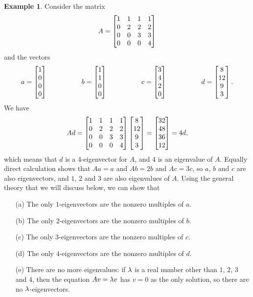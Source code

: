 \documentclass[reqno]{amsart}
\theoremstyle{definition}
\newtheorem{example}[theorem]{Example}
\begin{document}
\begin{example}\label{eg-eigen-ii}
 Consider the matrix
 \[ A = \left[\begin{matrix} 1 & 1 & 1 & 1 \\
             0 & 2 & 2 & 2 \\
             0 & 0 & 3 & 3 \\
             0 & 0 & 0 & 4 \end{matrix}\right]
 \]
 and the vectors
 \[ a = \left[\begin{matrix} 1 \\ 0  \\ 0 \\ 0 \end{matrix}\right] \hspace{5em}
    b = \left[\begin{matrix} 1 \\ 1  \\ 0 \\ 0 \end{matrix}\right] \hspace{5em}
    c = \left[\begin{matrix} 3 \\ 4  \\ 2 \\ 0 \end{matrix}\right] \hspace{5em}
    d = \left[\begin{matrix} 8 \\ 12 \\ 9 \\ 3 \end{matrix}\right].
 \]
 We have
 \[ Ad =
        \left[\begin{matrix} 1 & 1 & 1 & 1 \\
             0 & 2 & 2 & 2 \\
             0 & 0 & 3 & 3 \\
             0 & 0 & 0 & 4 \end{matrix}\right]
        \left[\begin{matrix} 8 \\ 12 \\ 9 \\ 3 \end{matrix}\right] =
        \left[\begin{matrix} 32 \\ 48 \\ 36 \\ 12 \end{matrix}\right] = 4d,
 \]
 which means that $d$ is a $4$-eigenvector for $A$, and $4$ is an
 eigenvalue of $A$.  Equally direct calculation shows that $Aa=a$ and
 $Ab=2b$ and $Ac=3c$, so $a$, $b$ and $c$ are also eigenvectors, and
 $1$, $2$ and $3$ are also eigenvalues of $A$.  Using the general
 theory that we will discuss below, we can show that
 \begin{itemize}
  \item[(a)] The only $1$-eigenvectors are the nonzero multiples of
   $a$.
  \item[(b)] The only $2$-eigenvectors are the nonzero multiples of
   $b$.
  \item[(c)] The only $3$-eigenvectors are the nonzero multiples of
   $c$.
  \item[(d)] The only $4$-eigenvectors are the nonzero multiples of
   $d$.
  \item[(e)] There are no more eigenvalues: if $\lambda$ is a real number
   other than $1$, $2$, $3$ and $4$, then the equation $Av=\lambda v$ has
   $v=0$ as the only solution, so there are no $\lambda$-eigenvectors.
 \end{itemize}
\end{example}
\end{document}
